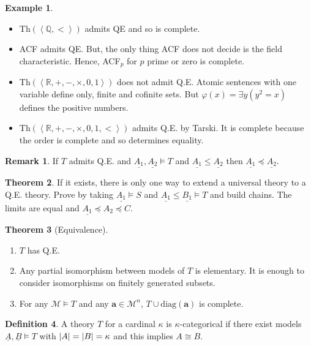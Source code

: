 \documentclass[a4paper,10pt]{article}
\theoremstyle{definition}
\newtheorem{theorem}{Theorem}
\newtheorem*{remark}{Remark}
\DeclarePairedDelimiter\abs{\lvert}{\rvert}
\newtheorem{definition}[theorem]{Definition}
\newtheorem{example}[theorem]{Example}
\let\vec\mathbf
\let\preceq\preccurlyeq
\begin{document}
\begin{example}
    \begin{itemize}
        \item Th$(\left\langle \mathbb{Q}, < \right\rangle )$ admits QE and so is complete.
        \item ACF admits QE. But, the only thing ACF does not decide is the field characteristic. Hence, ACF$_p$ for $p$ prime or zero is complete.
        \item Th$(\left\langle \mathbb{R}, +, -, \times, 0, 1\right\rangle )$ does not admit Q.E. Atomic sentences with one variable define only, finite and cofinite sets. But $\varphi(x) = \exists y (y^2 = x)$ defines the positive numbers.
        \item Th$(\left\langle \mathbb{R}, +, -, \times, 0, 1, < \right\rangle )$ admits Q.E. by Tarski. It is complete because the order is complete and so determines equality.
    \end{itemize}
\end{example}

\begin{remark}
    If $T$ admits Q.E. and $\underline{A_1},\underline{A_2} \models T$ and $ \underline{A_1} \leqslant \underline{A_2}$ then $\underline{A_1} \preceq \underline{A_2}$.
\end{remark}

\begin{theorem}
    If it exists, there is only one way to extend a universal theory to a Q.E. theory. Prove by taking $\underline{A_1} \models S$ and $\underline{A_1} \leqslant \underline{B_1} \models T$ and build chains. The limits are equal and $\underline{A_1} \preceq A_2 \preceq C$.
\end{theorem}

\begin{theorem}[Equivalence]
    \begin{enumerate}
        \item $T$ has Q.E.
        \item Any partial isomorphism between models of $T$ is elementary. It is enough to consider isomorphisms on finitely generated subsets.
        \item For any $\mathcal{M} \models T$ and any $\vec{a} \in \mathcal{M}^n$, $T \cup \mathrm{diag}(\vec{a})$ is complete.
    \end{enumerate}
\end{theorem}

\begin{definition}
    A theory $T$ for a cardinal $\kappa$ is $\kappa$-categorical if there exist models $\underline{A}, \underline{B} \models T$ with $\abs{A} = \abs{B} = \kappa$ and this implies $A \cong B$.
\end{definition}
\end{document}
